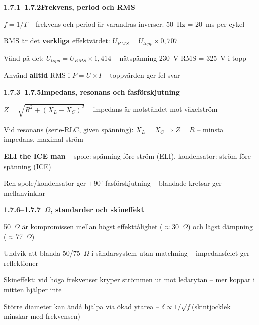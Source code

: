 \documentclass[a4paper,11pt,twoside]{book}
\newcommand{\emoji}[1]{{\emojifont #1}}
\begin{document}
\begin{orangebox}[title={\emoji{🎯} Viktigt för provet -- Kapitel 1.7}]

\textbf{1.7.1--1.7.2\quad Frekvens, period och RMS}
\begin{checklist}
  \item $f = 1/T$ -- frekvens och period är varandras inverser. 50~Hz = 20~ms per cykel
  \item RMS är det \textbf{verkliga} effektvärdet: $U_{RMS} = U_{topp} \times 0{,}707$
  \item Vänd på det: $U_{topp} = U_{RMS} \times 1{,}414$ -- nätspänning 230~V RMS = 325~V i topp
  \item Använd \textbf{alltid} RMS i $P = U \times I$ -- toppvärden ger fel svar
\end{checklist}

\textbf{1.7.3--1.7.5\quad Impedans, resonans och fasförskjutning}
\begin{checklist}
  \item $Z = \sqrt{R^2 + (X_L - X_C)^2}$ -- impedans är motståndet mot växelström
  \item Vid resonans (serie-RLC, given spänning): $X_L = X_C \Rightarrow Z = R$ -- minsta impedans, maximal ström
  \item \textbf{ELI the ICE man} -- spole: spänning före ström (ELI), kondensator: ström före spänning (ICE)
  \item Ren spole/kondensator ger $\pm 90^\circ$ fasförskjutning -- blandade kretsar ger mellanvinklar
\end{checklist}

\textbf{1.7.6--1.7.7~$\Omega$, standarder och skineffekt}
\begin{checklist}
  \item 50~$\Omega$ är kompromissen mellan högst effekttålighet ($\approx$30~$\Omega$) och lägst dämpning ($\approx$77~$\Omega$)
  \item Undvik att blanda 50/75~$\Omega$ i sändarsystem utan matchning -- impedansfelet ger reflektioner
  \item Skineffekt: vid höga frekvenser kryper strömmen ut mot ledarytan -- mer koppar i mitten hjälper inte
  \item Större diameter kan ändå hjälpa via ökad ytarea -- $\delta \propto 1/\sqrt{f}$\quad(skintjocklek minskar med frekvensen)
\end{checklist}


\end{orangebox}
\end{document}
